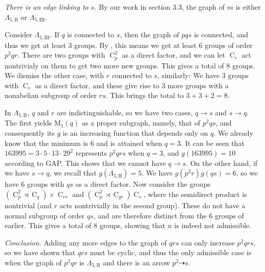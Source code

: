\documentclass[draft]{article}
\newcommand{\cyc}[1]{\operatorname{C}_{#1}}
\newcommand{\qlamz}{\Lambda_{5,\text{II}}}
\newcommand{\qlamd}{\Lambda_{5,\text{III}}}
\newcommand{\m}[1]{\text{M}_{#1}}
\theoremstyle{plain}
\theoremstyle{definition}
\begin{document}
 \emph{There is an edge linking to $s$.} By our work in section 3.3, the graph of $m$ is either $\qlamz$ or $\qlamd$.

Consider $\qlamd$. If $q$ is connected to $s$, then the graph of $pqs$ is connected, and thus we get at least 3 groups. By , this means we get at least 6 groups of order $p^2 qr$. There are two groups with $\cyc{p}^2$ as a direct factor, and we can let $\cyc{r}$ act nontrivialy on them to get two more new groups. This gives a total of 8 groups. We dismiss the other case, with $r$ connected to $s$, similarly: We have 3 groups with $\cyc{r}$ as a direct factor, and these give rise to 3 more groups with a nonabelian subgroup of order $rs$. This brings the total to $3 + 3 + 2 = 8$.

In $\qlamz$, $q$ and $r$ are indistinguishable, so we have two cases, $q \rightarrow s$ and $s \rightarrow q$. The first yields $\m1(q)$ as a proper subgraph, namely, that of $p^2 q s$, and consequently its $g$ is an increasing function that depends only on $q$. We already know that the minimum is 6 and is attained when $q = 3$. It can be seen that $163995 = 3 \cdot 5 \cdot 13 \cdot 29^2$ represents $p^2 q r s$ when $q = 3$, and $g(163995) = 10$ according to GAP. This shows that we cannot have $q \rightarrow s$. On the other hand, if we have $s \rightarrow q$, we recall that $g(\qlamz) = 5$. We have $g(p^2 r)g(qs) = 6$, so we have 6 groups with $qs$ as a direct factor. Now consider the groups $(\cyc{p}^2 \rtimes \cyc{q}) \times \cyc{rs}$ and $(\cyc{p}^2 \rtimes \cyc{qr}) \cyc{s}$, where the semidirect product is nontrivial (and $r$ acts nontrivially in the second group). These do not have a normal subgroup of order $qs$, and are therefore distinct from the 6 groups of earlier. This gives a total of 8 groups, showing that $n$ is indeed not admissible.

\emph{Conclusion.} Adding any more edges to the graph of $qrs$ can only increase $p^2 q r s$, so we have shown that $qrs$ must be cyclic, and thus the only admissible case is when the graph of $p^2 q r$ is $\qlamz$ and there is an arrow $p^2 \dashrightarrow s$.
\end{document}
